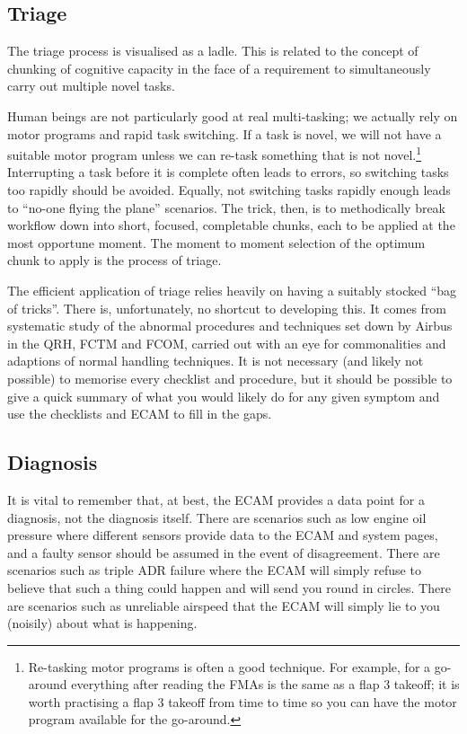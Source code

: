 \documentclass[a5paper,11pt,titlepage]{article}
\begin{document}
\subsection{Triage}
The triage process is visualised as a ladle. This is related to the
concept of chunking of cognitive capacity in the face of a requirement
to simultaneously carry out multiple novel tasks.

Human beings are not particularly good at real multi-tasking; we
actually rely on motor programs and rapid task switching. If a task is
novel, we will not have a suitable motor program unless we can re-task
something that is not novel.\footnote{Re-tasking motor programs is often a good technique. For
  example, for a go-around everything after reading the FMAs is the same
  as a flap 3 takeoff; it is worth practising a flap 3 takeoff from time
  to time so you can have the motor program available for the
  go-around.} Interrupting a task before it is complete often leads to
errors, so switching tasks too rapidly should be avoided. Equally, not
switching tasks rapidly enough leads to ``no-one flying the plane''
scenarios. The trick, then, is to methodically break workflow down into
short, focused, completable chunks, each to be applied at the most
opportune moment. The moment to moment selection of the optimum chunk to
apply is the process of triage.

The efficient application of triage relies heavily on having a suitably
stocked ``bag of tricks''. There is, unfortunately, no shortcut to
developing this. It comes from systematic study of the abnormal
procedures and techniques set down by Airbus in the QRH, FCTM and FCOM,
carried out with an eye for commonalities and adaptions of normal
handling techniques. It is not necessary (and likely not possible) to
memorise every checklist and procedure, but it should be possible to
give a quick summary of what you would likely do for any given symptom
and use the checklists and ECAM to fill in the gaps.

\subsection{Diagnosis}

It is vital to remember that, at best, the ECAM provides a data point
for a diagnosis, not the diagnosis itself. There are scenarios such as
low engine oil pressure where different sensors provide data to the ECAM
and system pages, and a faulty sensor should be assumed in the event of
disagreement. There are scenarios such as triple ADR failure where the
ECAM will simply refuse to believe that such a thing could happen and
will send you round in circles. There are scenarios such as unreliable
airspeed that the ECAM will simply lie to you (noisily) about what is
happening.
\end{document}

